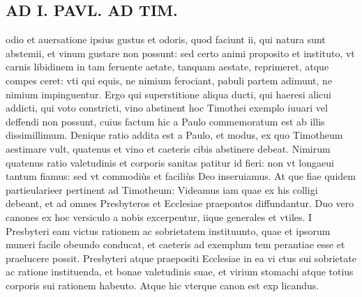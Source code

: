 \documentclass{article}
\begin{document}
\begin{pages}
\section*{AD I. PAVL. AD TIM. }\pstart odio et auersatione ipsius gustus et odoris, quod faciunt ii, qui natura sunt abstemii, et vinum gustare non possunt: sed certo animi proposito et instituto, vt carnis libidinem in tam feruente aetate, tanquam aestate, reprimeret, atque compes ceret: vti qui equis, ne nimium ferociant, pabuli partem adimunt, ne nimium impinguentur.  \pend\pstart Ergo qui superstitione aliqua ducti, qui haeresi alicui addicti, qui voto constricti, vino abstinent hoc Timothei exemplo iuuari vel deffendi non possunt, cuius factum hic a Paulo commemoratum est ab illis dissimillimum.  \pend\pstart Denique ratio addita est a Paulo, et modus, ex quo Timotheum aestimare vult, quatenus et vino et caeteris cibis abstinere debeat. Nimirum quatenus ratio valetudinis et corporis sanitas patitur id fieri: non vt longaeui tantum fiamus: sed vt commodiùs et faciliùs Deo inseruiamus. At que fiae quidem partieularieer pertinent ad Timotheum: Videamus iam quae ex his colligi debeant, et ad omnes Presbyteros et Ecclesiae praepontos diffundantur. Duo vero canones ex hoc versiculo a nobis excerpentur, iique generales et vtiles.  \pend\pstart I Presbyteri eam victus rationem ac sobrietatem instituunto, quae et ipsorum muneri facile obeundo conducat, et caeteris ad exemplum tem perantiae esse et praelucere possit.  \pend{} Presbyteri atque praepositi Ecclesiae in ea vi ctus sui sobrietate ac ratione instituenda, et bonae valetudinis suae, et virium stomachi atque totius corporis sui rationem habeuto.  \pend\pstart Atque hic vterque canon est exp licandus.  \pend

\end{pages}
\end{document}
